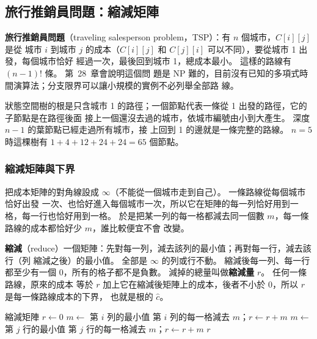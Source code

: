 \subsection{旅行推銷員問題：縮減矩陣}
\label{sec:bk-tsp}

\textbf{旅行推銷員問題}（traveling salesperson problem，TSP）：有 $n$ 個城市，$C[i][j]$ 是從
城市 $i$ 到城市 $j$ 的成本（$C[i][j]$ 和 $C[j][i]$ 可以不同），要從城市 1 出發，每個城市恰好
經過一次，最後回到城市 1，總成本最小。 這樣的路線有 $(n - 1)!$ 條。 第~28~章會說明這個問
題是 NP 難的，目前沒有已知的多項式時間演算法；分支限界可以讓小規模的實例不必列舉全部路
線。

狀態空間樹的根是只含城市 1 的路徑；一個節點代表一條從 1 出發的路徑，它的子節點是在路徑後面
接上一個還沒去過的城市，依城市編號由小到大產生。 深度 $n - 1$ 的葉節點已經走過所有城市，接
上回到 1 的邊就是一條完整的路線。 $n = 5$ 時這棵樹有 $1 + 4 + 12 + 24 + 24 = 65$ 個節點。

\subsubsection{縮減矩陣與下界}

把成本矩陣的對角線設成 $\infty$（不能從一個城市走到自己）。 一條路線從每個城市恰好出發
一次、也恰好進入每個城市一次，所以它在矩陣的每一列恰好用到一格，每一行也恰好用到一格。
於是把某一列的每一格都減去同一個數 $m$，每一條路線的成本都恰好少 $m$，誰比較便宜不會
改變。

\textbf{縮減}（reduce）一個矩陣：先對每一列，減去該列的最小值；再對每一行，減去該行（列
縮減之後）的最小值。 全部是 $\infty$ 的列或行不動。 縮減後每一列、每一行都至少有一個
$0$，所有的格子都不是負數。 減掉的總量叫做\textbf{縮減量} $r$。 任何一條路線，原來的成本
等於 $r$ 加上它在縮減後矩陣上的成本，後者不小於 $0$，所以 $r$ 是每一條路線成本的下界，
也就是根的 $\hat c$。

\begin{pseudo}[label=alg:bk-reduce]{縮減矩陣}
 
    \State $r \gets 0$
        \State $m \gets$ 第 $i$ 列的最小值
            \State 第 $i$ 列的每一格減去 $m$；$r \gets r + m$
        \EndIf
    \EndFor
        \State $m \gets$ 第 $j$ 行的最小值
            \State 第 $j$ 行的每一格減去 $m$；$r \gets r + m$
        \EndIf
    \EndFor
    \State \Return $r$
\EndFunction
\end{pseudo}

